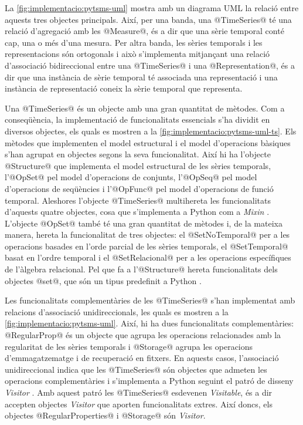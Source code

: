 La \autoref{fig:implementacio:pytsms-uml} mostra amb un diagrama
UML la relació entre aquests tres objectes principals. Així, per una
banda, una @TimeSeries@ té una relació d'agregació amb les
@Measure@, és a dir que una sèrie temporal conté cap, una o més
d'una mesura.  Per altra banda, les sèries temporals i les
representacions són ortogonals i això s'implementa mitjançant una
relació d'associació bidireccional entre una @TimeSeries@ i una
@Representation@, és a dir que una instància de sèrie temporal té
associada una representació i una instància de representació coneix la
sèrie temporal que representa.




Una @TimeSeries@ és un objecte amb una gran quantitat de
mètodes. Com a conseqüència, la implementació de funcionalitats
essencials s'ha dividit en diversos objectes, els quals es mostren a
la \autoref{fig:implementacio:pytsms-uml-ts}. Els mètodes que
implementen el model estructural i el model d'operacions bàsiques
s'han agrupat en objectes segons la seva funcionalitat. Així hi ha
l'objecte @Structure@ que implementa el model estructural de les
sèries temporals, l'@OpSet@ pel model d'operacions de conjunts,
l'@OpSeq@ pel model d'operacions de seqüències i l'@OpFunc@
pel model d'operacions de funció temporal.  Aleshores l'objecte
@TimeSeries@ multihereta les funcionalitats d'aquests quatre
objectes, cosa que s'implementa a Python com a
\emph{Mixin} \parencite[\S 8.3.6, \S 20.17]{python:doc2}.  L'objecte
@OpSet@ també té una gran quantitat de mètodes i, de la mateixa
manera, hereta la funcionalitat de tres objectes: el
@SetNoTemporal@ per a les operacions basades en l'orde parcial de
les sèries temporals, el @SetTemporal@ basat en l'ordre temporal
i el @SetRelacional@ per a les operacions específiques de
l'àlgebra relacional. Pel que fa a l'@Structure@ hereta
funcionalitats dels objectes @set@, que són un tipus predefinit a
Python \parencite[\S 5.7]{python:doc2}.


Les funcionalitats complementàries de les @TimeSeries@ s'han
implementat amb relacions d'associació unidireccionals, les quals es
mostren a la \autoref{fig:implementacio:pytsms-uml}. Així, hi ha dues
funcionalitats complementàries: @RegularProp@ és un objecte que agrupa
les operacions relacionades amb la regularitat de les sèries temporals
i @Storage@ agrupa les operacions d'emmagatzematge i de recuperació en
fitxers. En aquests casos, l'associació unidireccional indica que les
@TimeSeries@ són objectes que admeten les operacions complementàries i
s'implementa a Python seguint el patró de disseny
\emph{Visitor} \parencite{ziade08:expert_python_programming:visitor,martin02:visitor}. Amb
aquest patró les @TimeSeries@ esdevenen \emph{Visitable}, és a dir
accepten objectes \emph{Visitor} que aporten funcionalitats
extres. Així doncs, els objectes @RegularProperties@ i @Storage@ són
\emph{Visitor}.


